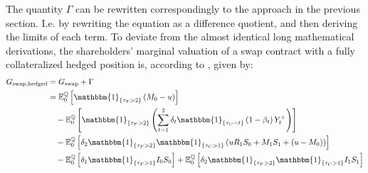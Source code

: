 \documentclass[main.tex]{subfiles}
\begin{document}
        The quantity $\Gamma$ can be rewritten correspondingly to the approach in the previous section.
        I.e. by rewriting the equation as a difference quotient, and then deriving the limits of each term.
        To deviate from the almost identical long mathematical derivations,
        the shareholders' marginal valuation of a swap contract with a fully collateralized hedged position is, according to \textcite{ADS2018}, given by:
        \begin{align}
            G_{\text{swap,hedged}} &= G_{\text{swap}} + \Gamma
            \\
            &=
            \mathbb{E}_{0}^{\rnmeasure}\left[
                \mathbbm{1}_{\{\tau_{F}>2\}}
                \left(
                    M_0 - u
                \right)
            \right]
            \nonumber
            \\
            &\quad-
            \mathbb{E}_{0}^{\rnmeasure}\left[
                \mathbbm{1}_{\{\tau_{F}>2\}}
                \left(
                    \sum_{t=1}^{2} \delta_{t} \mathbbm{1}_{\{\tau_{C}=t\}}\left(1-\beta_t\right)Y_{t}^{+}
                \right)
            \right]
            \nonumber
            \\
            &\quad-
            \mathbb{E}_{0}^{\rnmeasure}\left[
                \delta_2 \mathbbm{1}_{\{\tau_{F}>2\}} \mathbbm{1}_{\{\tau_{C}>1\}}
                \left(
                    u R_{1} S_{0} + M_{1} S_{1} + (u - M_0)
                \right)
            \right]
            \nonumber
            \\
            &\quad-
            \mathbb{E}_{0}^{\rnmeasure}\left[
                \delta_1 \mathbbm{1}_{\{\tau_{F}>1\}}
                I_0 S_0 
            \right] 
            +
            \mathbb{E}_{0}^{\rnmeasure}\left[
                \delta_2 \mathbbm{1}_{\{\tau_{F}>2\}} \mathbbm{1}_{\{\tau_{C}>1\}}
                I_1 S_1 
            \right] 
        \end{align}
\end{document}
